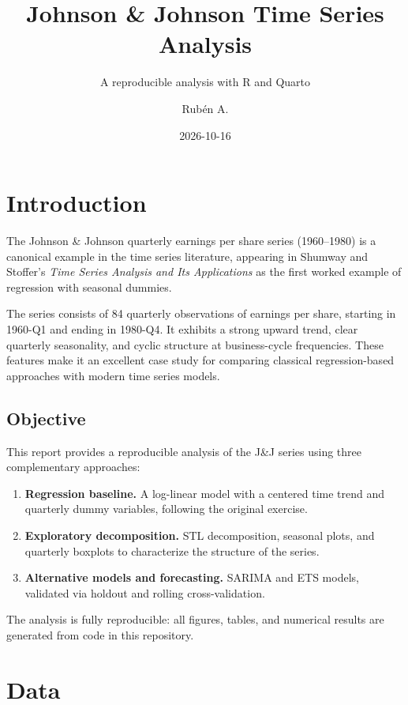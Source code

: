 \documentclass[
  english,
  a4paper,
]{article}
\title{Johnson \& Johnson Time Series Analysis}
\subtitle{A reproducible analysis with R and Quarto}
\author{Rubén A.}
\date{2026-10-16}
\providecommand{\tightlist}{%
  \setlength{\itemsep}{0pt}\setlength{\parskip}{0pt}}
\begin{document}
\maketitle


\section{Introduction}\label{introduction}

The Johnson \& Johnson quarterly earnings per share series (1960--1980)
is a canonical example in the time series literature, appearing in
Shumway and Stoffer's \emph{Time Series Analysis and Its Applications}
as the first worked example of regression with seasonal dummies.

The series consists of 84 quarterly observations of earnings per share,
starting in 1960-Q1 and ending in 1980-Q4. It exhibits a strong upward
trend, clear quarterly seasonality, and cyclic structure at
business-cycle frequencies. These features make it an excellent case
study for comparing classical regression-based approaches with modern
time series models.

\subsection{Objective}\label{objective}

This report provides a reproducible analysis of the J\&J series using
three complementary approaches:

\begin{enumerate}
\def\labelenumi{\arabic{enumi}.}
\tightlist
\item
  \textbf{Regression baseline.} A log-linear model with a centered time
  trend and quarterly dummy variables, following the original exercise.
\item
  \textbf{Exploratory decomposition.} STL decomposition, seasonal plots,
  and quarterly boxplots to characterize the structure of the series.
\item
  \textbf{Alternative models and forecasting.} SARIMA and ETS models,
  validated via holdout and rolling cross-validation.
\end{enumerate}

The analysis is fully reproducible: all figures, tables, and numerical
results are generated from code in this repository.

\section{Data}\label{data}
\end{document}
